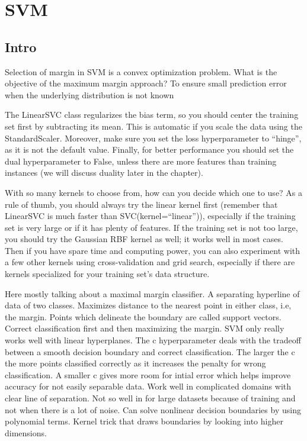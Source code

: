 \documentclass[]{book}
\theoremstyle{definition}
\theoremstyle{definition}
\theoremstyle{definition}
\theoremstyle{remark}
\begin{document}
\section{SVM}\label{svm}

\subsection{Intro}\label{intro-9}

Selection of margin in SVM is a convex optimization problem. What is the
objective of the maximum margin approach? To ensure small prediction
error when the underlying distribution is not known

The LinearSVC class regularizes the bias term, so you should center the
training set first by subtracting its mean. This is automatic if you
scale the data using the StandardScaler. Moreover, make sure you set the
loss hyperparameter to ``hinge'', as it is not the default value.
Finally, for better performance you should set the dual hyperparameter
to False, unless there are more features than training instances (we
will discuss duality later in the chapter).

With so many kernels to choose from, how can you decide which one to
use? As a rule of thumb, you should always try the linear kernel first
(remember that LinearSVC is much faster than SVC(kernel=``linear'')),
especially if the training set is very large or if it has plenty of
features. If the training set is not too large, you should try the
Gaussian RBF kernel as well; it works well in most cases. Then if you
have spare time and computing power, you can also experiment with a few
other kernels using cross-validation and grid search, especially if
there are kernels specialized for your training set's data structure.

Here mostly talking about a maximal margin classifier. A separating
hyperline of data of two classes. Maximizes distance to the nearest
point in either class, i.e, the margin. Points which delineate the
boundary are called support vectors. Correct classification first and
then maximizing the margin. SVM only really works well with linear
hyperplanes. The c hyperparameter deals with the tradeoff between a
smooth decision boundary and correct classification. The larger the c
the more points classified correctly as it increases the penalty for
wrong classification. A smaller c gives more room for intial error which
helps improve accuracy for not easily separable data. Work well in
complicated domains with clear line of separation. Not so well in for
large datasets because of training and not when there is a lot of noise.
Can solve nonlinear decision boundaries by using polynomial terms.
Kernel trick that draws boundaries by looking into higher dimensions.
\end{document}
